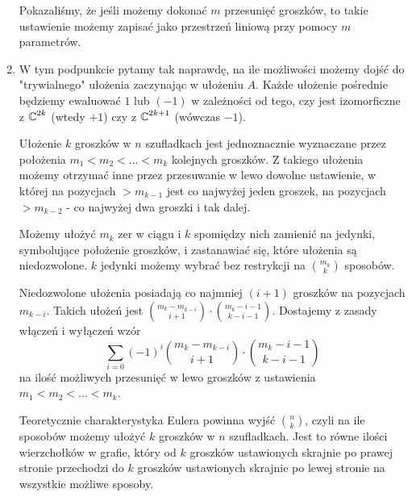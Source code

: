 \begin{enumerate}[label=\textbf{(\alph*)}]
    Pokazaliśmy, że jeśli możemy dokonać $m$ przesunięć groszków, to takie ustawienie możemy zapisać jako przestrzeń liniową przy pomocy $m$ parametrów.

  \item W tym podpunkcie pytamy tak naprawdę, na ile możliwości możemy dojść do "trywialnego" ułożenia zaczynając w ułożeniu $A$. Każde ułożenie pośrednie będziemy ewaluować $1$ lub $(-1)$ w zależności od tego, czy jest izomorficzne z $\operatorname{\mathbb{C}}^{2k}$ (wtedy $+1$) czy z $\operatorname{\mathbb{C}}^{2k+1}$ (wówczas $-1$).



    Ułożenie $k$ groszków w $n$ szufladkach jest jednoznacznie wyznaczane przez położenia $m_1<m_2<...<m_k$ kolejnych groszków. Z takiego ułożenia możemy otrzymać inne przez przesuwanie w lewo dowolne ustawienie, w której na pozycjach $>m_{k-1}$ jest co najwyżej jeden groszek, na pozycjach $>m_{k-2}$ - co najwyżej dwa groszki i tak dalej.

    Możemy ułożyć $m_k$ zer w ciągu i $k$ spomiędzy nich zamienić na jedynki, symbolujące położenie groszków, i zastanawiać się, które ułożenia są niedozwolone. $k$ jedynki możemy wybrać bez restrykcji na $\binom{m_k}{k}$ sposobów. 

    Niedozwolone ułożenia posiadają co najmniej $(i+1)$ groszków na pozycjach $m_{k-i}$. Takich ułożeń jest $\binom{m_k-m_{k-i}}{i+1}\cdot\binom{m_k-i-1}{k-i-1}$. Dostajemy z zasady włączeń i wyłączeń wzór
    $$\sum_{i=0}(-1)^i\binom{m_k-m_{k-i}}{i+1}\cdot\binom{m_k-i-1}{k-i-1}$$
    na ilość możliwych przesunięć w lewo groszków z ustawienia $m_1<m_2<...<m_k$.

    Teoretycznie charakterystyka Eulera powinna wyjść $\binom{n}{k}$, czyli na ile sposobów możemy ułożyć $k$ groszków w $n$ szufladkach. Jest to równe ilości wierzchołków w grafie, który od $k$ groszków ustawionych skrajnie po prawej stronie przechodzi do $k$ groszków ustawionych skrajnie po lewej stronie na wszystkie możliwe sposoby.
\end{enumerate}
